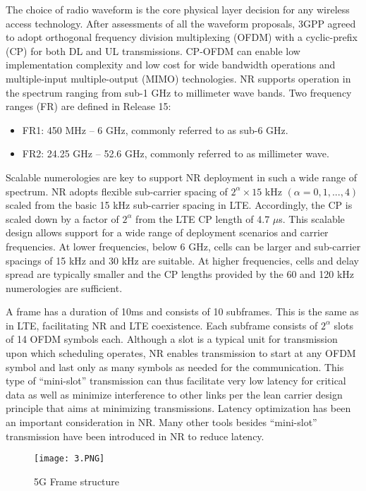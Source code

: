 The choice of radio waveform is the core physical layer decision for any wireless access technology. After assessments of all the waveform proposals, 3GPP agreed to adopt orthogonal frequency division multiplexing (OFDM) with a cyclic-prefix (CP) for both DL and UL transmissions. CP-OFDM can enable low implementation complexity and low cost for wide bandwidth operations and multiple-input multiple-output (MIMO) technologies. 
NR supports operation in the spectrum ranging from sub-1 GHz to millimeter wave bands. Two frequency ranges (FR) are defined in Release 15:
\begin{itemize}
    \item FR1: 450 MHz – 6 GHz, commonly referred to as sub-6 GHz.
    \item FR2: 24.25 GHz – 52.6 GHz, commonly referred to as millimeter wave. 
\end{itemize}
	 
	  

Scalable numerologies are key to support NR deployment in such a wide range of spectrum. NR adopts flexible sub-carrier spacing of $2^\alpha \times 15$ kHz $(\alpha = 0,1,...,4 )$  scaled from the basic 15 kHz sub-carrier spacing in LTE. Accordingly, the CP is scaled down by a factor of $2^\alpha$ from the LTE CP length of 4.7 $\mu$s. This scalable design allows support for a wide range of deployment scenarios and carrier frequencies. At lower frequencies, below 6 GHz, cells can be larger and sub-carrier spacings of 15 kHz and 30 kHz are suitable. At higher frequencies, cells and delay spread are typically smaller and the CP lengths provided by the 60 and 120 kHz numerologies are sufficient.

A frame has a duration of 10ms and consists of 10 subframes. This is the same as in LTE, facilitating NR and LTE coexistence. Each subframe consists of $2^\alpha$ slots of 14 OFDM symbols each. Although a slot is a typical unit for transmission upon which scheduling operates, NR enables transmission to start at any OFDM symbol and last only as many symbols as needed for the communication. This type of “mini-slot” transmission can thus facilitate very low latency for critical data as well as minimize interference to other links per the lean carrier design principle that aims at minimizing transmissions. Latency optimization has been an important consideration in NR. Many other tools besides “mini-slot” transmission have been introduced in NR to reduce latency.
\begin{figure}[h]
\centering
\texttt{[image: 3.PNG]}
\caption{5G Frame structure}
\end{figure}

